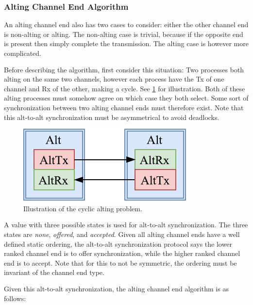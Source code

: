 \subsubsection{Alting Channel End Algorithm}

An alting channel end also has two cases to consider: either the other channel end is non\hyp{}alting or alting. The non\hyp{}alting case is trivial, because if the opposite end is present then simply complete the transmission. The alting case is however more complicated. 

Before describing the algorithm, first consider this situation: Two processes both alting on the same two channels, however each process have the Tx of one channel and Rx of the other, making a cycle. See \cref{fig:alting_problem} for illustration. Both of these alting processes must somehow agree on which case they both select. Some sort of synchronization between two alting channel ends must therefore exist. Note that this alt\hyp{}to\hyp{}alt synchronization must be asymmetrical to avoid deadlocks.

\begin{figure}[h!]
    \centering
    \includegraphics[width=0.6\linewidth]{fig/alting_problem}
    \caption{Illustration of the cyclic alting problem.}
    \label{fig:alting_problem}
\end{figure}

A value with three possible states is used for alt\hyp{}to\hyp{}alt synchronization. The three states are \textit{none}, \textit{offered}, and \textit{accepted}. Given all alting channel ends have a well defined static ordering, the alt\hyp{}to\hyp{}alt synchronization protocol says the lower ranked channel end is to offer synchronization, while the higher ranked channel end is to accept. Note that for this to not be symmetric, the ordering must be invariant of the channel end type.

Given this alt\hyp{}to\hyp{}alt synchronization, the alting channel end algorithm is as follows:

